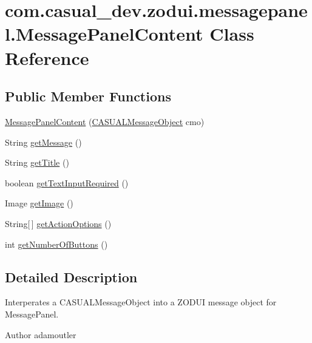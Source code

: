 \hypertarget{classcom_1_1casual__dev_1_1zodui_1_1messagepanel_1_1_message_panel_content}{\section{com.\-casual\-\_\-dev.\-zodui.\-messagepanel.\-Message\-Panel\-Content Class Reference}
\label{classcom_1_1casual__dev_1_1zodui_1_1messagepanel_1_1_message_panel_content}
}
\subsection*{Public Member Functions}
\begin{DoxyCompactItemize}
\item 
\hyperlink{classcom_1_1casual__dev_1_1zodui_1_1messagepanel_1_1_message_panel_content_a24b8187783ecc240b7e2b1d5ce8ad444}{Message\-Panel\-Content} (\hyperlink{class_c_a_s_u_a_l_1_1_c_a_s_u_a_l_message_object}{C\-A\-S\-U\-A\-L\-Message\-Object} cmo)
\item 
String \hyperlink{classcom_1_1casual__dev_1_1zodui_1_1messagepanel_1_1_message_panel_content_a16bd6daeb4df424b2b90e18b0b1da19e}{get\-Message} ()
\item 
String \hyperlink{classcom_1_1casual__dev_1_1zodui_1_1messagepanel_1_1_message_panel_content_ab254c3b0d587660c3a8d724fbe2f4808}{get\-Title} ()
\item 
boolean \hyperlink{classcom_1_1casual__dev_1_1zodui_1_1messagepanel_1_1_message_panel_content_a3b0ef4d8b714ca8f40a13f8db1faa9da}{get\-Text\-Input\-Required} ()
\item 
Image \hyperlink{classcom_1_1casual__dev_1_1zodui_1_1messagepanel_1_1_message_panel_content_a453d6ceb657a0a3c3e97870a9467917e}{get\-Image} ()
\item 
String\mbox{[}$\,$\mbox{]} \hyperlink{classcom_1_1casual__dev_1_1zodui_1_1messagepanel_1_1_message_panel_content_ac713550770531c27a9e278636d473eb5}{get\-Action\-Options} ()
\item 
int \hyperlink{classcom_1_1casual__dev_1_1zodui_1_1messagepanel_1_1_message_panel_content_a92684c9882abdd3e0749d82f2773bfaa}{get\-Number\-Of\-Buttons} ()
\end{DoxyCompactItemize}


\subsection{Detailed Description}
Interperates a C\-A\-S\-U\-A\-L\-Message\-Object into a Z\-O\-D\-U\-I message object for Message\-Panel. \begin{DoxyAuthor}{Author}
adamoutler 
\end{DoxyAuthor}


